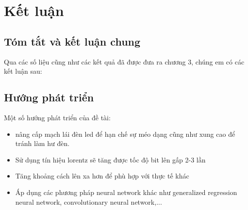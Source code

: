 \chapter{Kết luận}

\section{Tóm tắt và kết luận chung}

Qua các số liệu cũng như các kết quả đã được đưa ra chương 3, chúng em có các kết luận sau:


\section{Hướng phát triển}

Một số hướng phát triển của đề tài:
\begin{itemize}
	\item nâng cấp mạch lái đèn led để hạn chế sự méo dạng cũng như xung cao để tránh làm hư đèn.
	\item Sử dụng tín hiệu lorentz sẽ tăng được tốc độ bit lên gấp 2-3 lần
	\item Tăng khoảng cách lên xa hơn để phù hợp với thực tế khác 
	\item Áp dụng các phương pháp neural network khác như generalized regression neural network, convolutionary neural network,...
\end{itemize}

